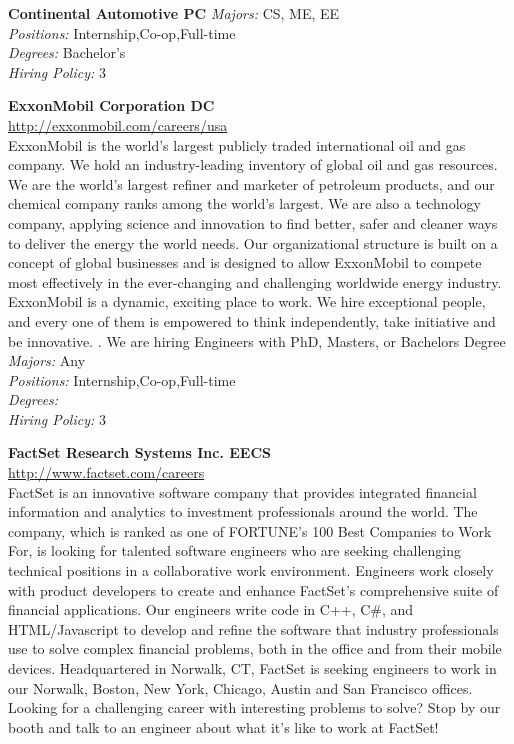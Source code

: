 \documentclass[twoside]{article}
\begin{document}
\begin{center}
\begin{multicols}{2}
\begin{minipage}{.95\columnwidth}{\Large\bf Continental Automotive \hfill PC}
    \emph{Majors:} CS, ME, EE\\
    \emph{Positions:} Internship,Co-op,Full-time\\
    \emph{Degrees:} Bachelor's\\
    \emph{Hiring Policy:} 3\\
\end{minipage}
 \begin{minipage}{.95\columnwidth}{\Large\bf ExxonMobil Corporation \hfill DC}\\
    \url{http://exxonmobil.com/careers/usa}\\
    ExxonMobil is the world’s largest publicly traded international oil and gas company. We hold an industry-leading inventory of global oil and gas resources. We are the world’s largest refiner and marketer of petroleum products, and our chemical company ranks among the world’s largest. We are also a technology company, applying science and innovation to find better, safer and cleaner ways to deliver the energy the world needs. Our organizational structure is built on a concept of global businesses and is designed to allow ExxonMobil to compete most effectively in the ever-changing and challenging worldwide energy industry. ExxonMobil is a dynamic, exciting place to work. We hire exceptional people, and every one of them is empowered to think independently, take initiative and be innovative. . We are hiring Engineers with PhD, Masters, or Bachelors Degree\\
    \emph{Majors:} Any\\
    \emph{Positions:} Internship,Co-op,Full-time\\
    \emph{Degrees:} \\
    \emph{Hiring Policy:} 3\\
\end{minipage}
 \begin{minipage}{.95\columnwidth}{\Large\bf FactSet Research Systems Inc. \hfill EECS}\\
    \url{http://www.factset.com/careers}\\
    FactSet is an innovative software company that provides integrated financial information and analytics to investment professionals around the world. The company, which is ranked as one of FORTUNE’s 100 Best Companies to Work For, is looking for talented software engineers who are seeking challenging technical positions in a collaborative work environment. Engineers work closely with product developers to create and enhance FactSet's comprehensive suite of financial applications. Our engineers write code in C++, C\#, and HTML/Javascript to develop and refine the software that industry professionals use to solve complex financial problems, both in the office and from their mobile devices. Headquartered in Norwalk, CT, FactSet is seeking engineers to work in our Norwalk, Boston, New York, Chicago, Austin and San Francisco offices. Looking for a challenging career with interesting problems to solve? Stop by our booth and talk to an engineer about what it’s like to work at FactSet!\\

\end{minipage}
\end{multicols}
\end{center}
\end{document}
